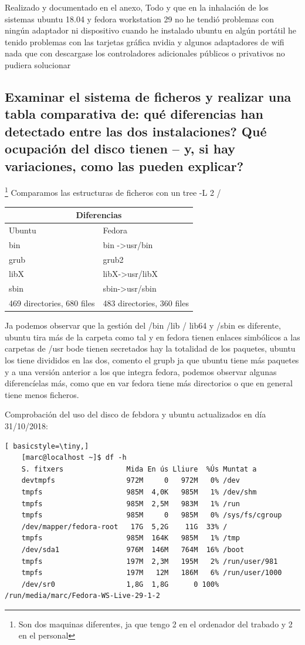 \documentclass[preprint,11pt]{elsarticle}
\begin{document}
Realizado y documentado en el anexo, Todo y que en la inhalación de los sistemas ubuntu 18.04 y fedora workstation 29 no he tendió problemas con ningún adaptador ni dispositivo cuando he instalado ubuntu en algún portátil he tenido problemas con las tarjetas gráfica nvidia y algunos adaptadores de wifi nada que con descargase los controladores adicionales públicos o privativos no pudiera solucionar

\subsection{Examinar el sistema de ficheros y realizar una tabla comparativa de: qué diferencias han detectado entre las dos instalaciones? Qué ocupación del disco tienen – y, si hay variaciones, como las pueden explicar?} 
\footnote{Son dos maquinas diferentes, ja que tengo 2 en el ordenador del trabado y 2 en el personal} Comparamos las estructuras de ficheros con un tree -L 2 / 

\begin{tabular}{ |p{7cm}||p{7cm}| }
    \hline
    \multicolumn{2}{|c|}{Diferencias} \\
    \hline
    Ubuntu& Fedora\\
    \hline
   	bin   & bin -\textgreater  usr/bin   \\
    grub &   grub2 \\
    libX & libX-\textgreater usr/libX\\
    sbin & sbin-\textgreater usr/sbin\\
    469 directories, 680 files & 	483 directories, 360 files \\
    \hline
\end{tabular}

Ja podemos observar que la gestión del /bin /lib / lib64 y /sbin es diferente, ubuntu tira más de la carpeta como tal y en fedora tienen enlaces simbólicos a las carpetas de /usr bode tienen secretados hay la totalidad de los paquetes, ubuntu los tiene divididos en las dos, comento el grupb ja que ubuntu tiene más paquetes y a una versión anterior a los que integra fedora, podemos observar algunas diferencíelas más, como que en var fedora tiene más directorios o que en general tiene menos ficheros. \bigskip

Comprobación del uso del disco de febdora y ubuntu actualizados en día 31/10/2018:
\begin{lstlisting}[ basicstyle=\tiny,]
    [marc@localhost ~]$ df -h
    S. fitxers               Mida En ús Lliure  %Ús Muntat a
    devtmpfs                 972M     0   972M   0% /dev
    tmpfs                    985M  4,0K   985M   1% /dev/shm
    tmpfs                    985M  2,5M   983M   1% /run
    tmpfs                    985M     0   985M   0% /sys/fs/cgroup
    /dev/mapper/fedora-root   17G  5,2G    11G  33% /
    tmpfs                    985M  164K   985M   1% /tmp
    /dev/sda1                976M  146M   764M  16% /boot
    tmpfs                    197M  2,3M   195M   2% /run/user/981
    tmpfs                    197M   12M   186M   6% /run/user/1000
    /dev/sr0                 1,8G  1,8G      0 100% /run/media/marc/Fedora-WS-Live-29-1-2

\end{lstlisting}
\end{document}
